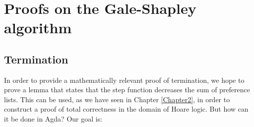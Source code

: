 {\begin{code}%
\>[0]\AgdaSymbol{\{{-}\#}\AgdaSpace{}%
\AgdaSpace{}%
\AgdaSymbol{\#{-}\}}\<%
\\
\>[0]\AgdaSpace{}%
\AgdaSymbol{:}\AgdaSpace{}%
\AgdaSymbol{(}\AgdaSpace{}%
\AgdaSymbol{:}\AgdaSpace{}%
\AgdaSymbol{)}\AgdaSpace{}%
\AgdaSpace{}%
\<%
\\
\>[0]\AgdaSpace{}%
\AgdaSymbol{(}\AgdaSpace{}%
\AgdaSpace{}%
\AgdaInductiveConstructor{[]}\AgdaSpace{}%
\AgdaSpace{}%
\AgdaSpace{}%
\AgdaSpace{}%
\AgdaSpace{}%
\AgdaSymbol{)}\AgdaSpace{}%
\AgdaSymbol{=}\AgdaSpace{}%
\AgdaSpace{}%
\AgdaSpace{}%
\AgdaInductiveConstructor{[]}\AgdaSpace{}%
\AgdaSpace{}%
\AgdaSpace{}%
\AgdaSpace{}%
\AgdaSpace{}%
\<%
\\
\>[0]\AgdaSpace{}%
\AgdaSpace{}%
\AgdaSymbol{=}\AgdaSpace{}%
\AgdaSpace{}%
\AgdaSymbol{(}\AgdaSpace{}%
\AgdaSymbol{)}\<%
\end{code}

\section{Proofs on the Gale-Shapley algorithm}

\subsection{Termination}

In order to provide a mathematically relevant proof of termination, we hope to prove a lemma that states that the step function decreases the sum of preference lists. This can be used, as we have seen in Chapter \ref{Chapter2}, in order to construct a proof of total correctness in the domain of Hoare logic. But how can it be done in Agda? Our goal is:

}
